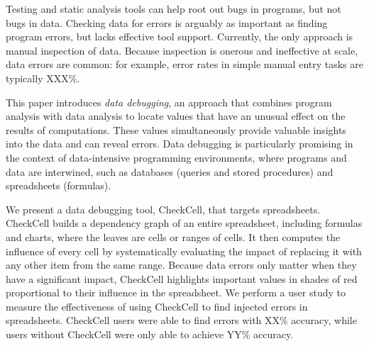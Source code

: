 Testing and static analysis tools can help root out bugs in programs,
but not bugs in data. Checking data for errors is arguably as
important as finding program errors, but lacks effective tool
support. Currently, the only approach is manual inspection of
data. Because inspection is onerous and ineffective at scale, data
errors are common: for example, error rates in simple manual entry
tasks are typically XXX\%.

This paper introduces \emph{data debugging}, an approach that combines
program analysis with data analysis to locate values that have an
unusual effect on the results of computations. These values
simultaneously provide valuable insights into the data and can reveal
errors.  Data debugging is particularly promising in the context of
data-intensive programming environments, where programs and data are
interwined, such as databases (queries and stored procedures) and
spreadsheets (formulas).

We present a data debugging tool, CheckCell, that targets
spreadsheets. CheckCell builds a dependency graph of an entire
spreadsheet, including formulas and charts, where the leaves are cells
or ranges of cells. It then computes the influence of every cell by
systematically evaluating the impact of replacing it with any other
item from the same range. Because data errors only matter when they
have a significant impact, CheckCell highlights important values in
shades of red proportional to their influence in the spreadsheet.  We
perform a user study to measure the effectiveness of using
CheckCell to find injected errors in spreadsheets. CheckCell users
were able to find errors with XX\% accuracy, while users without
CheckCell were only able to achieve YY\% accuracy.
